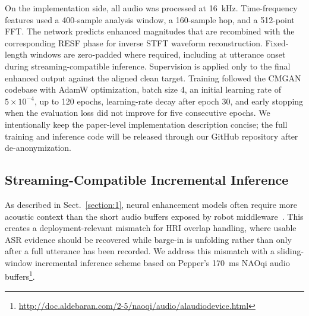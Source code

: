 \documentclass[manuscript,screen,review]{acmart}
\begin{document}
On the implementation side, all audio was processed at 16~kHz. Time-frequency features used a 400-sample analysis window, a 160-sample hop, and a 512-point FFT. The network predicts enhanced magnitudes that are recombined with the corresponding RESF phase for inverse STFT waveform reconstruction. Fixed-length windows are zero-padded where required, including at utterance onset during streaming-compatible inference. Supervision is applied only to the final enhanced output against the aligned clean target. Training followed the CMGAN codebase with AdamW optimization, batch size 4, an initial learning rate of $5\times10^{-4}$, up to 120 epochs, learning-rate decay after epoch 30, and early stopping when the evaluation loss did not improve for five consecutive epochs. We intentionally keep the paper-level implementation description concise; the full training and inference code will be released through our GitHub repository after de-anonymization.


\subsection{Streaming-Compatible Incremental Inference}
\label{Section:Semi-real-time}

As described in Sect.~\ref{section:1}, neural enhancement models often require more acoustic context than the short audio buffers exposed by robot middleware~\cite{drgas2023survey,fan2022real}. This creates a deployment-relevant mismatch for HRI overlap handling, where usable ASR evidence should be recovered while barge-in is unfolding rather than only after a full utterance has been recorded. We address this mismatch with a sliding-window incremental inference scheme based on Pepper's 170~ms NAOqi audio buffers\footnote{\url{http://doc.aldebaran.com/2-5/naoqi/audio/alaudiodevice.html}}.
\end{document}
